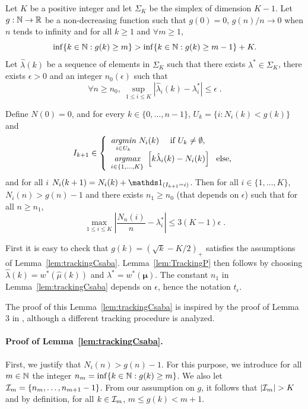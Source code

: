 \documentclass{colt2016} %
\begin{document}
\begin{lemma}\label{lem:trackingCsaba}
	Let $K$ be a positive integer and let $\Sigma_K$ be the simplex of dimension $K-1$.
	Let $g:\mathbb{N}\to\mathbb{R}$ be a non-decreasing function such that $g(0)=0$, $g(n)/n \rightarrow 0$ when $n$ tends to infinity %
	and for all $k\geq 1$ and $\forall m\geq 1$,
    \[\inf\{k\in \mathbb{N} : g(k)\geq m\} > \inf\{k\in \mathbb{N}: g(k)\geq m-1\} +K.\]	
    	Let $\hat{\lambda}(k)$ be a sequence of elements in $\Sigma_K$ such that there exists $\lambda^* \in \Sigma_K$, there exists $\epsilon>0$ and an integer $n_0(\epsilon)$ such that  
    	\[\forall n \geq n_0 , \ \sup_{1 \leq i \leq K} | \hat{\lambda}_i(k) - \lambda^*_i| \leq \epsilon\;.\]
    	    	

	Define $N(0)=0$, and for every $k\in\{0,\dots,n-1\}$, $U_k = \{ i : N_i(k) < g(k)\}$ and 
	\[I_{k+1} \in \left\{\begin{array}{l}
	                    \underset{i \in U_k}{\emph{argmin}} \ N_{i}(k) \ \ \ \  \text{if} \ U_k \neq \emptyset, \\
	                    \underset{i \in \{1,\dots,K\}}{\emph{argmax}} \ \left[k\hat{\lambda}_i(k) - N_i(k)\right] \ \ \text{else},
	                     \end{array}
        \right.
        \]
	and  for all $i$ $N_{i}(k+1) = N_{i}(k) + \ind_{(I_{k+1}=i)}$.
       Then for all $i \in \{1,\dots,K\}$, $N_i(n) > g(n) -1$ and there exists $n_1 \geq n_0$ (that depends on $\epsilon$) such that for all $n \geq n_1$, 
    \[\max_{1\leq i\leq K} \left|\frac{N_n(i)}{n}-\lambda^*_i\right| \leq 3(K-1)\epsilon\;.\]
\end{lemma}

First it is easy to check that $g(k)=(\sqrt{k} - K/2)_+$ satisfies the assumptions of Lemma~\ref{lem:trackingCsaba}. Lemma~\ref{lem:TrackingP} then  follows by choosing $\hat{\lambda}(k) = w^*(\hat{\mu}(k))$ and $\lambda^* = w^*(\bm \mu)$. The constant $n_1$ in Lemma~\ref{lem:trackingCsaba} depends on $\epsilon$, hence the notation $t_\epsilon$. 

The proof of this Lemma~\ref{lem:trackingCsaba} is inspired by the proof of Lemma 3 in \cite{CsabaTracking}, although a different tracking procedure is analyzed. 

\paragraph{Proof of Lemma~\ref{lem:trackingCsaba}.} First, we justify that $N_i(n) > g(n)-1$. For this purpose, we introduce for all $m\in \mathbb{N}$ the integer $n_m=\inf\{k \in \mathbb{N} : g(k)\geq m\}$. We also let $\mathcal{I}_m = \{ n_m, \dots, n_{m+1} -1 \}$. From our assumption on $g$, it follows that $|\mathcal{I}_m| > K$ and by definition, for all $k \in \mathcal{I}_m$, $m \leq g(k) < m +1$. 
\end{document}
